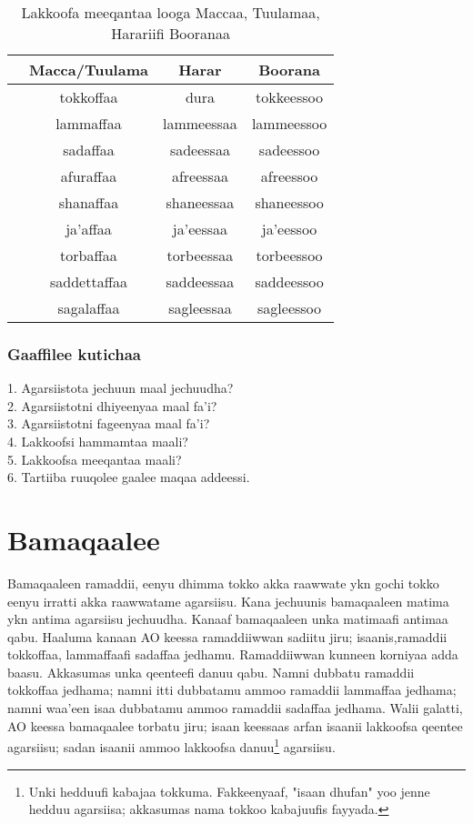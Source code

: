 \documentclass[11pt,b5paper]{book}
\begin{document}
\begin{table}[H]
	\begin{tabular}{cccc}
		\hline\hline
		& Macca/Tuulama & Harar & Boorana \\
		\hline
		& tokkoffaa & dura & tokkeessoo \\
		\hline
		& lammaffaa & lammeessaa & lammeessoo \\
		\hline
		& sadaffaa & sadeessaa & sadeessoo \\
		\hline
		& afuraffaa & afreessaa & afreessoo \\
		\hline
		& shanaffaa & shaneessaa & shaneessoo \\
		\hline
		& ja'affaa & ja'eessaa & ja'eessoo \\
		\hline
		& torbaffaa & torbeessaa & torbeessoo \\
		\hline
		& saddettaffaa & saddeessaa & saddeessoo \\
		\hline
		& sagalaffaa & sagleessaa & sagleessoo \\
		\hline
	\end{tabular}
	\caption{Lakkoofa meeqantaa looga Maccaa, Tuulamaa, Harariifi Booranaa}
\end{table}

\subsubsection{Gaaffilee kutichaa}

1. Agarsiistota jechuun maal jechuudha?\\
2. Agarsiistotni dhiyeenyaa maal fa’i?\\
3. Agarsiistotni fageenyaa maal fa’i?\\
4. Lakkoofsi hammamtaa maali?\\
5. Lakkoofsa meeqantaa maali?\\
6. Tartiiba ruuqolee gaalee maqaa addeessi.

\newpage
\section{Bamaqaalee}

Bamaqaaleen ramaddii, eenyu dhimma tokko akka raawwate ykn gochi tokko eenyu irratti akka raawwatame agarsiisu. Kana
jechuunis bamaqaaleen matima ykn antima agarsiisu jechuudha. Kanaaf bamaqaaleen unka matimaafi antimaa qabu. Haaluma kanaan AO keessa ramaddiiwwan sadiitu jiru; isaanis,ramaddii tokkoffaa, lammaffaafi sadaffaa jedhamu.
Ramaddiiwwan kunneen korniyaa adda baasu. Akkasumas unka qeenteefi danuu qabu. Namni dubbatu ramaddii tokkoffaa
jedhama; namni itti dubbatamu ammoo ramaddii lammaffaa jedhama; namni waa'een isaa dubbatamu ammoo ramaddii
sadaffaa jedhama. Walii galatti, AO keessa bamaqaalee torbatu jiru; isaan keessaas arfan isaanii lakkoofsa qeentee agarsiisu; sadan isaanii ammoo lakkoofsa danuu\footnote{Unki hedduufi kabajaa tokkuma. Fakkeenyaaf, "isaan dhufan" yoo jenne hedduu agarsiisa; akkasumas nama tokkoo kabajuufis fayyada.} agarsiisu. 
\end{document}
